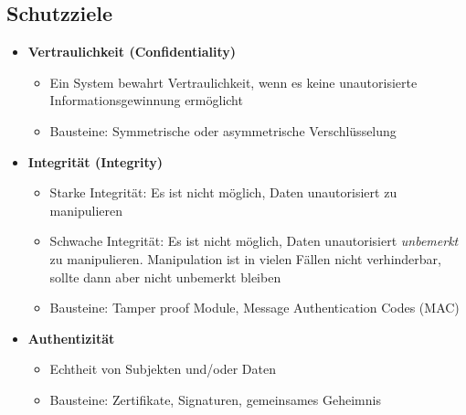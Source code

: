 \subsection{Schutzziele}
\begin{itemize}
	\item \textbf{Vertraulichkeit (Confidentiality)}
	\begin{itemize}
		\item Ein System bewahrt Vertraulichkeit, wenn es keine unautorisierte Informationsgewinnung ermöglicht
		\item Bausteine: Symmetrische oder asymmetrische Verschlüsselung
	\end{itemize}
	\item \textbf{Integrität (Integrity)}
	\begin{itemize}
		\item Starke Integrität: Es ist nicht möglich, Daten unautorisiert zu manipulieren
		\item Schwache Integrität: Es ist nicht möglich, Daten unautorisiert \textit{unbemerkt} zu manipulieren. Manipulation ist in vielen Fällen nicht verhinderbar, sollte dann aber nicht unbemerkt bleiben
		\item Bausteine: Tamper proof Module, Message Authentication Codes (MAC)
	\end{itemize}
	\item \textbf{Authentizität}
	\begin{itemize}
		\item Echtheit von Subjekten und/oder Daten
		\item Bausteine: Zertifikate, Signaturen, gemeinsames Geheimnis
	\end{itemize}
\end{itemize}


